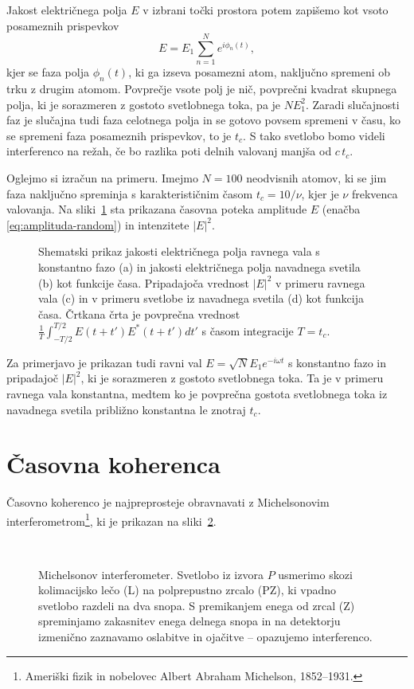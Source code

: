 Jakost električnega polja $E$ v izbrani točki prostora potem 
zapišemo kot vsoto posameznih prispevkov
\begin{equation}
E=E_{1}\sum_{n=1}^{N}e^{i\phi_{n}(t)},
\label{eq:amplituda-random}
\end{equation}
kjer se faza polja $\phi_{n}(t)$, ki ga izseva posamezni atom, naključno
spremeni ob trku z drugim atomom. Povprečje vsote polj je nič, 
povprečni kvadrat skupnega polja, ki je sorazmeren
z gostoto svetlobnega toka, pa je $NE_{1}^{2}$. Zaradi slučajnosti faz je 
slučajna tudi faza celotnega polja in se gotovo povsem spremeni v času, ko se
spremeni faza posameznih prispevkov, to je $t_{c}$. S tako svetlobo bomo videli 
interferenco na režah, če bo razlika poti delnih valovanj manjša od $c\, t_{c}$.

Oglejmo si izračun
na primeru. Imejmo $N=100$ neodvisnih atomov, ki se jim faza naključno
spreminja s karakterističnim časom $t_{c}=10/\nu$, kjer je $\nu$
frekvenca valovanja. Na sliki~\ref{fig:amplituda-intenziteta} sta
prikazana časovna poteka amplitude $E$ (enačba \ref{eq:amplituda-random})
in intenzitete $|E|^{2}$.
\begin{figure}[ht]
\centering
\def\svgwidth{128truemm} 

\caption{Shematski prikaz jakosti električnega polja 
ravnega vala s konstantno fazo (a) in jakosti električnega
polja navadnega svetila (b) kot funkcije časa. 
Pripadajoča vrednost $|E|^2$ v primeru ravnega vala (c) in 
v primeru svetlobe iz navadnega svetila (d) kot funkcija
časa. Črtkana črta je povprečna vrednost
$\frac{1}{T}\int_{-T/2}^{T/2}E(t+t')E^{*}(t+t')dt'$
s časom integracije $T=t_{c}$.}
\label{fig:amplituda-intenziteta}
\end{figure}

Za primerjavo je prikazan tudi ravni val $E=\sqrt{N}E_{1}e^{-i\omega t}$
s konstantno fazo in pripadajoč $|E|^{2}$, ki je sorazmeren z gostoto svetlobnega
toka. Ta je v primeru ravnega vala konstantna, medtem ko je povprečna gostota
svetlobnega toka iz navadnega svetila približno konstantna le znotraj $t_{c}$.

\section{Časovna koherenca}
\label{sec:casovna-koherenca}

Časovno koherenco je najpreprosteje obravnavati 
z Michelsonovim 
interferometrom\footnote{Ameriški fizik in nobelovec Albert Abraham Michelson, 1852--1931.},
ki je prikazan na sliki~\ref{fig:michelson}. 
\begin{figure}[ht]
\centering
\def\svgwidth{70truemm} 
\\
\caption{\label{fig:michelson}Michelsonov interferometer. Svetlobo
iz izvora $P$ usmerimo skozi kolimacijsko lečo (L) na polprepustno
zrcalo (PZ), ki vpadno svetlobo razdeli na dva snopa. S premikanjem 
enega od zrcal (Z) spreminjamo zakasnitev enega delnega snopa in
na detektorju izmenično zaznavamo oslabitve in ojačitve -- opazujemo interferenco.}
\end{figure}

